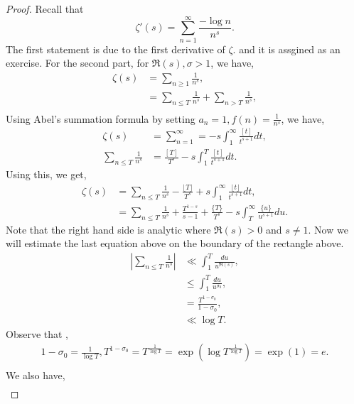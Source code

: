 \documentclass{article}
\begin{document}
  \begin{proof}
    Recall that 
    \begin{equation*}
      \zeta'(s) = \sum_{n=1}^\infty {\frac {-\log n} {n^s}}.
    \end{equation*}
    The first statement is due to the first derivative of $\zeta$.  and it is assgined as an exercise. For the second part,
    for $\Re(s),\sigma>1$, we have,
    \begin{align*}
      \zeta(s) & = \sum_{n\geq 1}{\frac 1 {n^s}},\\
      & = \sum_{n\leq T}{\frac 1 {n^s}}+\sum_{n>T}{\frac 1 {n^s}},\\
    \end{align*}
    Using Abel's summation formula by setting $a_n= 1,f(n)={\frac 1 {n^s}}$, we have,
    \begin{align*} 
      \zeta(s) &= \sum_{n=1}^\infty =-s\int_1^\infty {\frac {[t]} {t^{s+1}}}dt,\\
      \sum_{n\leq T}{\frac 1 {n^s}} & = {\frac {[T]} {T^{s}}}-s\int_1^T{\frac {[t]} {t^{s+1}}}dt.
    \end{align*}
    Using this, we get,
    \begin{align*}
      \zeta(s)& = \sum_{n\leq T}{\frac 1 {n^s}}-{\frac {\lfloor T\rfloor} {T^s}}+s\int_1^\infty {\frac {\lfloor t\rfloor} {t^{s+1}}}dt,\\
      & = \sum_{n\leq T}{\frac 1 {n^s}}+{\frac {T^{1-s}} {s-1}} + {\frac {\{ T\}}{T^s}}-s\int_T^\infty {\frac {\{u\}} {u^{s+1}}}du.
    \end{align*}
    Note that the right hand side is analytic where $\Re(s)>0$ and $s\not=1$. Now we will estimate the last equation above on the boundary of the rectangle above.
    \begin{align*}
      \left\vert\sum_{n\leq T}{\frac 1 {n^s}}\right\vert & \ll  \int_1^T{\frac {du} {u^{\Re(s)}}},\\
      &\leq \int_1^T{\frac {du} {u^{\sigma_0}}},\\
      & = {\frac {T^{1-\sigma_0}} {1-\sigma_0}},\\
      &\ll \log T.
    \end{align*}
    Observe that ,
    \begin{align*}
      1-\sigma_0  = {\frac 1 {\log T}},T^{1-\sigma_0} = T^{{\frac 1 {\log T}}} = \exp(\log T^{{\frac 1 {\log T}}}) = \exp(1) = e.\\
    \end{align*}
    We also have,
    \begin{align*}

\end{align*}
\end{proof}
\end{document}
